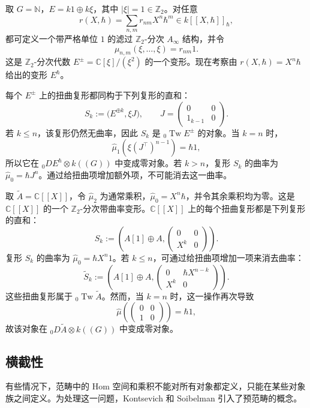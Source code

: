 \begin{example}[带曲率变形中的消失对象]\label{ex:filtered-curved-vanishing}
取 $G=\mathbb N$，$E=k1\oplus k\xi$，其中 $|\xi|=1\in\mathbb Z_2$。对任意
\[
  r(X,\hbar)=\sum_{n,m}r_{nm}X^n\hbar^m
  \in k[[X,\hbar]]_{\hbar},
\]
都可定义一个带严格单位 $1$ 的滤过 $\mathbb Z_2$-分次 $A_\infty$ 结构，并令
\[
  \mu_{n,m}(\xi,\ldots,\xi)=r_{nm}1.
\]
这是 $\mathbb Z_2$-分次代数 $E^{\pm}=\mathbb C[\xi]/(\xi^2)$ 的一个变形。现在考察由 $r(X,\hbar)=X^n\hbar$ 给出的变形 $E^{\hbar}$。

每个 $E^{\pm}$ 上的扭曲复形都同构于下列复形的直和：
\[
  S_k:=\bigl(E^{\oplus k},\xi J\bigr),\qquad
  J=\begin{pmatrix}0&0\\1_{k-1}&0\end{pmatrix}.
\]
若 $k\leq n$，该复形仍然无曲率，因此 $S_k$ 是 ${}_0\operatorname{Tw}E^{\pm}$ 的对象。当 $k=n$ 时，
\[
  \widehat\mu_1(\xi (J^\top)^{n-1})=\hbar1,
\]
所以它在 ${}_0D E^{\hbar}\otimes k((G))$ 中变成零对象。若 $k>n$，复形 $S_k$ 的曲率为 $\widehat\mu_0=\hbar J^n$。通过给扭曲项增加额外项，不可能消去这一曲率。
\end{example}

\begin{example}[形式幂级数环上的带曲率扭曲复形]\label{ex:filtered-power-series-curvature}
取 $\widetilde A=\mathbb C[[X]]$，令 $\widehat\mu_2$ 为通常乘积，$\widehat\mu_0=X^n\hbar$，并令其余乘积均为零。这是 $\mathbb C[[X]]$ 的一个 $\mathbb Z_2$-分次带曲率变形。$\mathbb C[[X]]$ 上的每个扭曲复形都是下列复形的直和：
\[
  S_k:=\left(A[1]\oplus A,
  \begin{pmatrix}0&0\\X^k&0\end{pmatrix}\right).
\]
复形 $S_k$ 的曲率为 $\widehat\mu_0=\hbar X^n1$。若 $k\leq n$，可通过给扭曲项增加一项来消去曲率：
\[
  \widetilde S_k:=\left(A[1]\oplus A,
  \begin{pmatrix}0&\hbar X^{n-k}\\X^k&0\end{pmatrix}\right).
\]
这些扭曲复形属于 ${}_0\operatorname{Tw}\widetilde A$。然而，当 $k=n$ 时，这一操作再次导致
\[
  \widehat\mu\!\left(\begin{pmatrix}0&0\\1&0\end{pmatrix}\right)
  =\hbar1,
\]
故该对象在 ${}_0D\widetilde A\otimes k((G))$ 中变成零对象。
\end{example}

\subsection{横截性}\label{subsec:transversality}
有些情况下，范畴中的 Hom 空间和乘积不能对所有对象都定义，只能在某些对象族之间定义。为处理这一问题，Kontsevich 和 Soibelman 引入了预范畴的概念。

